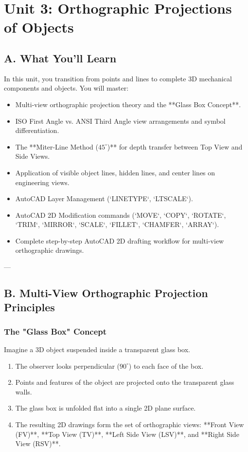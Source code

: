\chapter{Unit 3: Orthographic Projections of Objects}

\section{A. What You'll Learn}
In this unit, you transition from points and lines to complete 3D mechanical components and objects. You will master:
\begin{itemize}
    \item Multi-view orthographic projection theory and the **Glass Box Concept**.
    \item ISO First Angle vs. ANSI Third Angle view arrangements and symbol differentiation.
    \item The **Miter-Line Method ($45^\circ$)** for depth transfer between Top View and Side Views.
    \item Application of visible object lines, hidden lines, and center lines on engineering views.
    \item AutoCAD Layer Management (`LINETYPE`, `LTSCALE`).
    \item AutoCAD 2D Modification commands (`MOVE`, `COPY`, `ROTATE`, `TRIM`, `MIRROR`, `SCALE`, `FILLET`, `CHAMFER`, `ARRAY`).
    \item Complete step-by-step AutoCAD 2D drafting workflow for multi-view orthographic drawings.
\end{itemize}

---

\section{B. Multi-View Orthographic Projection Principles}

\subsection{The "Glass Box" Concept}
Imagine a 3D object suspended inside a transparent glass box.
\begin{enumerate}
    \item The observer looks perpendicular ($90^\circ$) to each face of the box.
    \item Points and features of the object are projected onto the transparent glass walls.
    \item The glass box is unfolded flat into a single 2D plane surface.
    \item The resulting 2D drawings form the set of orthographic views: **Front View (FV)**, **Top View (TV)**, **Left Side View (LSV)**, and **Right Side View (RSV)**.
\end{enumerate}

